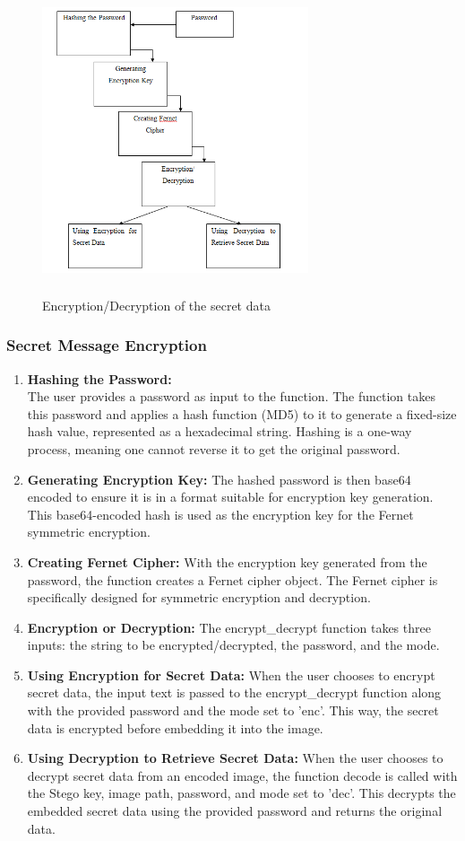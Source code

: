 \documentclass{report}
\begin{document}
\begin{figure}[htbp]
  \centering
  \includegraphics[width=0.7\textwidth, height=9cm]{image5.png} 
  \caption{Encryption/Decryption of the secret data }
  \label{fig:5}
\end{figure}

\subsubsection{Secret Message Encryption}
\begin{enumerate}
    \item \textbf{Hashing the Password:} \\
    The user provides a password as input to the function.
The function takes this password and applies a hash function (MD5) to it to generate a fixed-size hash value, represented as a hexadecimal string. Hashing is a one-way process, meaning one cannot reverse it to get the original password.
\item \textbf{Generating Encryption Key:}
The hashed password is then base64 encoded to ensure it is in a format suitable for encryption key generation.
This base64-encoded hash is used as the encryption key for the Fernet symmetric encryption.
\item \textbf{Creating Fernet Cipher:}
With the encryption key generated from the password, the function creates a Fernet cipher object. The Fernet cipher is specifically designed for symmetric encryption and decryption.
\item \textbf{Encryption or Decryption:}
The encrypt\_decrypt function takes three inputs: the string to be encrypted/decrypted, the password, and the mode. 
\item \textbf{Using Encryption for Secret Data:}
When the user chooses to encrypt secret data, the input text is passed to the encrypt\_decrypt function along with the provided password and the mode set to 'enc'. This way, the secret data is encrypted before embedding it into the image.
\item \textbf{Using Decryption to Retrieve Secret Data:}
When the user chooses to decrypt secret data from an encoded image, the function decode is called with the Stego key, image path, password, and mode set to 'dec'. This decrypts the embedded secret data using the provided password and returns the original data.

\end{enumerate}
\end{document}
